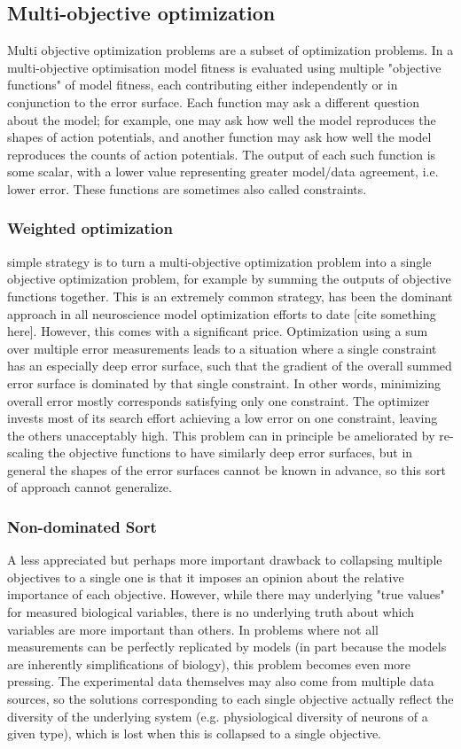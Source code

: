 \subsection{Multi-objective optimization} Multi objective optimization problems are a subset of optimization problems.
In a multi-objective optimisation model fitness is evaluated using multiple "objective functions" of model fitness, each contributing either independently or in conjunction to the error surface.
Each function may ask a different question about the model; for example, one may ask how well the model reproduces the shapes of action potentials, and another function may ask how well the model reproduces the counts of action potentials.
The output of each such function is some scalar, with a lower value representing greater model/data agreement, i.e. lower error.
These functions are sometimes also called constraints.

\subsubsection{Weighted optimization} simple strategy is to turn a multi-objective optimization problem into a single objective optimization problem, for example by summing the outputs of objective functions together. 
This is an extremely common strategy, has been the dominant approach in all neuroscience model optimization efforts to date [cite something here].
However, this comes with a significant price.
Optimization using a sum over multiple error measurements leads to a situation where a single constraint has an especially deep error surface, such that the gradient of the overall summed error surface is dominated by that single constraint.
In other words, minimizing overall error mostly corresponds satisfying only one constraint.
The optimizer invests most of its search effort achieving a low error on one constraint, leaving the others unacceptably high.
This problem can in principle be ameliorated by re-scaling the objective functions to have similarly deep error surfaces, but in general the shapes of the error surfaces cannot be known in advance, so this sort of approach cannot generalize.\\

\subsubsection{Non-dominated Sort} A less appreciated but perhaps more important drawback to collapsing multiple objectives to a single one is that it imposes an opinion about the relative importance of each objective.
However, while there may underlying "true values" for measured biological variables, there is no underlying truth about which variables are more important than others.
In problems where not all measurements can be perfectly replicated by models (in part because the models are inherently simplifications of biology), this problem becomes even more pressing.
The experimental data themselves may also come from multiple data sources, so the solutions corresponding to each single objective actually reflect the diversity of the underlying system (e.g. physiological diversity of neurons of a given type), which is lost when this is collapsed to a single objective.

